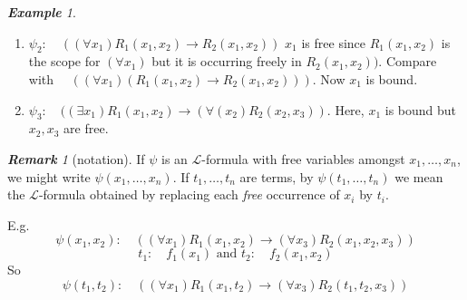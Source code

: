 \documentclass[a4paper,oneside,11pt,DIV=12,parskip=half]{scrartcl}
\newcommand{\LL}{\mathcal L}
\theoremstyle{plain}
\theoremstyle{definition}
\newtheorem{remark, definition}[theorem]{Remark and Definition.}
\newtheorem{lemma, definition}[theorem]{Lemma and Definition.}
\newtheorem{theorem, definition}[theorem]{Theorem and Definition.}
\theoremstyle{remark}
\newtheorem*{remark}{\textbf{Remark}}
\newtheorem*{example}{\textbf{Example}}
\newtheorem*{remark, example}{\textbf{Remark and Exercise}}
\begin{document}
\begin{example}
\begin{enumerate}
    \item $\psi_2: \quad ((\forall x_1)R_1(x_1,x_2) \rightarrow R_2(x_1,x_2))$
    $x_1$ is free since $R_1(x_1,x_2)$ is the scope for $(\forall x_1)$ but it is occurring freely in $R_2(x_1,x_2))$.
    Compare with 
    $ \quad ((\forall x_1)(R_1(x_1,x_2) \rightarrow R_2(x_1,x_2)))$. Now $x_1$ is bound.
    
    \item $\psi_3: \quad ((\exists x_1)R_1(x_1,x_2) \rightarrow (\forall(x_2)R_2(x_2,x_3))$.
    Here, $x_1$ is bound but $x_2,x_3$ are free.
\end{enumerate}
\end{example}

\begin{remark}[notation]
If $\psi$ is an $\LL$-formula with free variables amongst $x_1,\dots,x_n$, we might write $\psi(x_1,\dots,x_n)$.
If $t_1,\dots,t_n$ are terms, by $\psi(t_1,\dots,t_n)$ we mean the $\LL$-formula obtained by replacing each \emph{free} occurrence of $x_i$ by $t_i$.

E.g.
\[ \psi(x_1,x_2): \quad ((\forall x_1)R_1(x_1,x_2) \rightarrow (\forall x_3) R_2(x_1,x_2,x_3)) \]
\[t_1: \quad f_1(x_1) \text{ and } t_2: \quad f_2(x_1,x_2) \]
So 
\[ \psi(t_1,t_2): \quad ((\forall x_1)R_1(x_1,t_2) \rightarrow (\forall x_3) R_2(t_1,t_2,x_3)) \]
\end{remark}
\end{document}
